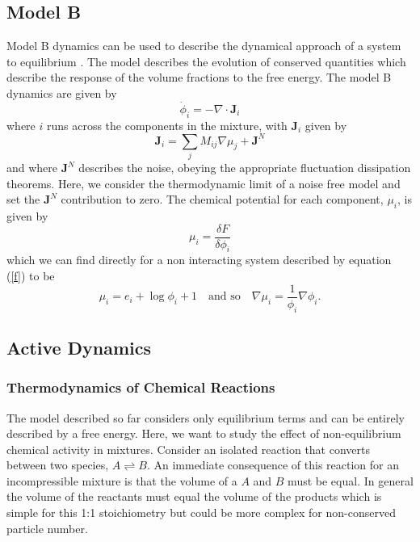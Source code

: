 \subsection{Model B}
Model B dynamics can be used to describe the dynamical approach of a system to equilibrium \cite{li_non-equilibrium_2020}. The model describes the evolution of conserved quantities which describe the response of the volume fractions to the free energy. The model B dynamics are given by \cite{cates_active_2019}
\begin{equation}
    \dot{\phi}_i = - \nabla \cdot \textbf{J}_i
    \label{modB1}
\end{equation}
where $i$ runs across the components in the mixture, with $\textbf{J}_i$ given by
\begin{equation}
    \textbf{J}_i = \sum_j M_{ij}\nabla\mu_j + \textbf{J}^N
    \label{modB2}
\end{equation}
and where $\textbf{J}^N$ describes the noise, obeying the appropriate fluctuation dissipation theorems. Here, we consider the thermodynamic limit of a noise free model and set the $ \textbf{J}^N$ contribution to zero. The chemical potential for each component, $\mu_i$, is given by
\begin{equation}
    \mu_i = \frac{\delta F}{\delta \phi_i}
\end{equation}
which we can find directly for a non interacting system described by equation (\ref{f}) to be
\begin{equation}
    \mu_i = e_i + \log\phi_i + 1 \quad \text{and so} \quad \nabla\mu_i = \frac{1}{\phi_i}\nabla\phi_i.
    \label{chempots}
\end{equation}

\subsection{Active Dynamics}

\subsubsection{Thermodynamics of Chemical Reactions}
The model described so far considers only equilibrium terms and can be entirely described by a free energy. Here, we want to study the effect of non-equilibrium chemical activity in mixtures. Consider an isolated reaction that converts between two species, $A \rightleftharpoons B$. An immediate consequence of this reaction for an incompressible mixture is that the volume of a $A$ and $B$ must be equal. In general the volume of the reactants must equal the volume of the products which is simple for this 1:1 stoichiometry but could be more complex for non-conserved particle number.


